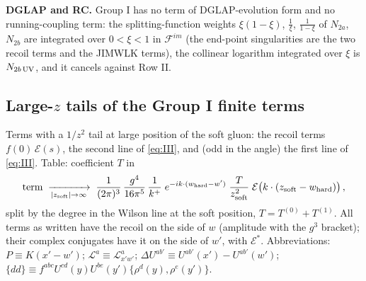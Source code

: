 \documentclass[9pt]{article}
\numberwithin{equation}{section}
\begin{document}
\noindent\textbf{DGLAP and RC.} Group I has no term of DGLAP-evolution form and no running-coupling term: the splitting-function weights $\xi(1-\xi)$, $\frac{1}{\xi}$, $\frac{1}{1-\xi}$ of $N_{2a}$, $N_{2b}$ are integrated over $0<\xi<1$ in $\mathcal{F}^{im}$ (the end-point singularities are the two recoil terms and the JIMWLK terms), the collinear logarithm integrated over $\xi$ is $N_{2b\,\rm UV}$, and it cancels against Row II.

\subsection{Large-$z$ tails of the Group I finite terms}\label{sec:tailsI}
\noindent Terms with a $1/z^{2}$ tail at large position of the soft gluon: the recoil terms $f(0)\,\mathcal{E}(s)$, the second line of \eqref{eq:III}, and (odd in the angle) the first line of \eqref{eq:III}. Table: coefficient $T$ in
\begin{align}
\text{term}\;\xrightarrow[|z_{\rm soft}|\to\infty]{}\;\frac{1}{(2\pi)^{3}}\,\frac{g^{4}}{16\pi^{5}}\,\frac{1}{k^{+}}\;e^{-ik\cdot(w_{\rm hard}-w')}\;\frac{T}{z_{\rm soft}^{2}}\;\mathcal{E}\big(k\cdot(z_{\rm soft}-w_{\rm hard})\big)\,,\notag
\end{align}
split by the degree in the Wilson line at the soft position, $T=T^{(0)}+T^{(1)}$. All terms as written have the recoil on the side of $w$ (amplitude with the $g^{3}$ bracket); their complex conjugates have it on the side of $w'$, with $\mathcal{E}^{*}$. Abbreviations: $P\equiv K(x'-w')$; $\mathcal{L}^{a}\equiv\mathcal{L}^{a}_{x'w'}$; $\Delta U^{ab'}\equiv U^{ab'}(x')-U^{ab'}(w')$; $\{dd\}\equiv f^{abc}U^{cd}(y)U^{be}(y')\{\rho^{d}(y),\rho^{e}(y')\}$.
\end{document}
